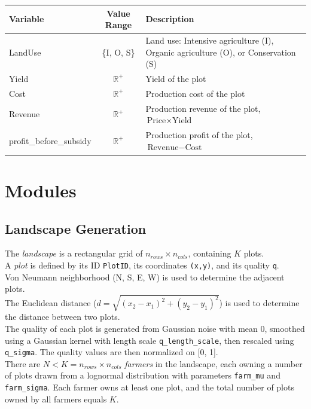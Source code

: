\documentclass{article}
\begin{document}
\begin{table}[h!]
\centering
\begin{tabular}{|l|c|p{5cm}|}
\hline
\textbf{Variable} & \textbf{Value Range} & \textbf{Description} \\
\hline
LandUse & \{I, O, S\} & Land use: Intensive agriculture (I), Organic agriculture (O), or Conservation (S) \\
\hline
Yield & $\mathbb{R}^+$ & Yield of the plot \\
\hline
Cost & $\mathbb{R}^+$ & Production cost of the plot \\
\hline
Revenue & $\mathbb{R}^+$ & Production revenue of the plot, $\text{Price} \times \text{Yield}$ \\
\hline
profit\_before\_subsidy & $\mathbb{R}^+$ & Production profit of the plot, $\text{Revenue} - \text{Cost}$ \\
\hline
\end{tabular}
\end{table}

\section{Modules}
\subsection{Landscape Generation}

The \emph{landscape} is a rectangular grid of $n_{rows} \times n_{cols}$, containing $K$ plots. \\

\noindent A \emph{plot} is defined by its ID \texttt{PlotID}, its coordinates \texttt{(x,y)}, and its quality \texttt{q}. \\
Von Neumann neighborhood (N, S, E, W) is used to determine the adjacent plots. \\
The Euclidean distance ($d = \sqrt{(x_2-x_1)^2 + (y_2-y_1)^2}$) is used to determine the distance between two plots. \\

\noindent The quality of each plot is generated from Gaussian noise with mean $0$, smoothed using a Gaussian kernel with length scale \texttt{q\_length\_scale}, then rescaled using \texttt{q\_sigma}. The quality values are then normalized on [0, 1]. \\

\noindent There are $N < K = n_{rows} \times n_{cols}$ \emph{farmers} in the landscape, each owning a number of plots drawn from a lognormal distribution with parameters \texttt{farm\_mu} and \texttt{farm\_sigma}. Each farmer owns at least one plot, and the total number of plots owned by all farmers equals $K$. 
\end{document}
